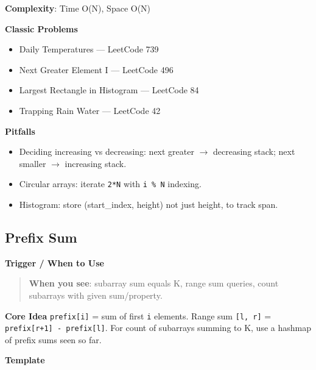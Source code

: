 \documentclass[11pt]{article}
\providecommand{\tightlist}{\setlength{\itemsep}{1pt}\setlength{\parskip}{0pt}}
\begin{document}
\textbf{Complexity}: Time O(N), Space O(N)

\textbf{Classic Problems}

\begin{itemize}
\tightlist
\item
  Daily Temperatures --- LeetCode 739
\item
  Next Greater Element I --- LeetCode 496
\item
  Largest Rectangle in Histogram --- LeetCode 84
\item
  Trapping Rain Water --- LeetCode 42
\end{itemize}

\textbf{Pitfalls}

\begin{itemize}
\tightlist
\item
  Deciding increasing vs decreasing: next greater \(\rightarrow\) decreasing stack; next smaller \(\rightarrow\) increasing stack.
\item
  Circular arrays: iterate \texttt{2*N} with \texttt{i\ \%\ N} indexing.
\item
  Histogram: store (start\_index, height) not just height, to track span.
\end{itemize}

\subsection{Prefix Sum}\label{prefix-sum}

\textbf{Trigger / When to Use}

\begin{quote}
\textbf{When you see}: subarray sum equals K, range sum queries, count subarrays with given sum/property.
\end{quote}

\textbf{Core Idea}
\texttt{prefix{[}i{]}} = sum of first \texttt{i} elements. Range sum \texttt{{[}l,\ r{]}} = \texttt{prefix{[}r+1{]}\ -\ prefix{[}l{]}}. For count of subarrays summing to K, use a hashmap of prefix sums seen so far.

\textbf{Template}

\end{document}
